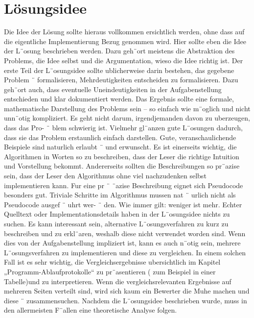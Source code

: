 \documentclass[a4paper,10pt,ngerman]{scrartcl}
\begin{document}
    \section{Lösungsidee}\label{sec:losungsidee}
    Die Idee der Lösung sollte hieraus vollkommen ersichtlich werden, ohne dass auf die eigentliche Implementierung Bezug genommen wird.
    Hier sollte eben die Idee der L¨osung beschrieben werden.
    Dazu geh¨ort meistens die Abstraktion des Problems, die Idee selbst und die Argumentation, wieso die Idee richtig ist.
    Der erste Teil der L¨osungsidee sollte ublicherweise darin bestehen, das gegebene Problem ¨
    formalisieren, Mehrdeutigkeiten entscheiden zu formalisieren.
    Dazu geh¨ort auch, dass eventuelle Uneindeutigkeiten in der Aufgabenstellung entschieden und klar dokumentiert werden.
    Das Ergebnis sollte eine formale, mathematische Darstellung des Problems sein – so einfach wie m¨oglich und nicht unn¨otig kompliziert.
    Es geht nicht darum, irgendjemanden davon zu uberzeugen, dass das Pro- ¨ blem schwierig ist.
    Vielmehr gl¨anzen gute L¨osungen dadurch, dass sie das Problem erstaunlich einfach darstellen.
    Gute, veranschaulichende Beispiele sind naturlich erlaubt ¨ und erwunscht.
    Es ist einerseits wichtig, die Algorithmen in Worten so zu beschreiben, dass der Leser
    die richtige Intuition und Vorstellung bekommt.
    Andererseits sollten die Beschreibungen so pr¨azise sein, dass der Leser den Algorithmus ohne viel nachzudenken selbst implementieren kann.
    Fur eine pr ¨ ¨azise Beschreibung eignet sich Pseudocode besonders gut.
    Triviale Schritte im Algorithmus mussen nat ¨ urlich nicht als Pseudocode ausgef ¨ uhrt wer- ¨ den.
    Wie immer gilt: weniger ist mehr.
    Echter Quelltext oder Implementationsdetails
    haben in der L¨osungsidee nichts zu suchen.
    Es kann interessant sein, alternative L¨osungsverfahren zu kurz zu beschreiben und zu
    erkl¨aren, weshalb diese nicht verwendet worden sind.
    Wenn dies von der Aufgabenstellung impliziert ist, kann es auch n¨otig sein, mehrere L¨osungsverfahren zu implementieren
    und diese zu vergleichen.
    In einem solchen Fall ist es sehr wichtig, die Vergleichsergebnisse ubersichtlich im Kapitel „Programm-Ablaufprotokolle“ zu pr¨asentieren
    ( zum Beispiel in einer Tabelle)und zu interpretieren.
    Wenn die vergleichsrelevanten Ergebnisse auf mehreren Seiten verteilt sind,
    wird sich kaum ein Bewerter die Muhe machen und diese ¨ zusammensuchen.
    Nachdem die L¨osungsidee beschrieben wurde, muss in den allermeisten F¨allen eine theoretische Analyse folgen.
\end{document}
